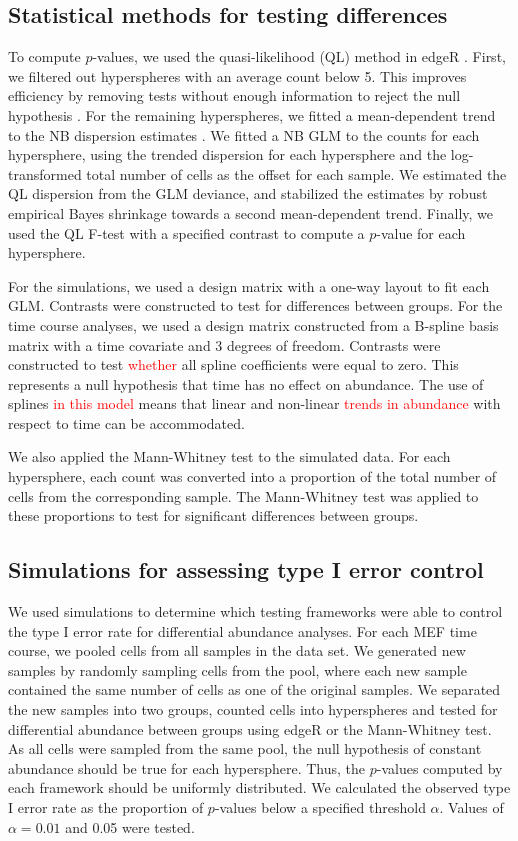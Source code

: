 \documentclass{article}
\newcommand\revised[1]{\textcolor{red}{#1}}
\begin{document}
\subsection{Statistical methods for testing differences}
To compute $p$-values, we used the quasi-likelihood (QL) method in edgeR \cite{lund2012detecting}.
First, we filtered out hyperspheres with an average count below 5.
This improves efficiency by removing tests without enough information to reject the null hypothesis \cite{bourgon2010independent}.
For the remaining hyperspheres, we fitted a mean-dependent trend to the NB dispersion estimates \cite{mccarthy2012differential}.
We fitted a NB GLM to the counts for each hypersphere, using the trended dispersion for each hypersphere and the log-transformed total number of cells as the offset for each sample.
We estimated the QL dispersion from the GLM deviance, and stabilized the estimates by robust empirical Bayes shrinkage \cite{phipson2016robust} towards a second mean-dependent trend.
Finally, we used the QL F-test with a specified contrast to compute a $p$-value for each hypersphere.

For the simulations, we used a design matrix with a one-way layout to fit each GLM.
Contrasts were constructed to test for differences between groups.
For the time course analyses, we used a design matrix constructed from a B-spline basis matrix with a time covariate and 3 degrees of freedom.
Contrasts were constructed to test \revised{whether} all spline coefficients were equal to zero.
This represents a null hypothesis that time has no effect on abundance.
The use of splines \revised{in this model} means that linear and non-linear \revised{trends in abundance} with respect to time can be accommodated.

We also applied the Mann-Whitney test to the simulated data.
For each hypersphere, each count was converted into a proportion of the total number of cells from the corresponding sample.
The Mann-Whitney test was applied to these proportions to test for significant differences between groups.

\subsection{Simulations for assessing type I error control}
We used simulations to determine which testing frameworks were able to control the type I error rate for differential abundance analyses.
For each MEF time course, we pooled cells from all samples in the data set.
We generated new samples by randomly sampling cells from the pool, where each new sample contained the same number of cells as one of the original samples.
We separated the new samples into two groups, counted cells into hyperspheres and tested for differential abundance between groups using edgeR or the Mann-Whitney test.
As all cells were sampled from the same pool, the null hypothesis of constant abundance should be true for each hypersphere.
Thus, the $p$-values computed by each framework should be uniformly distributed.
We calculated the observed type I error rate as the proportion of $p$-values below a specified threshold $\alpha$.
Values of $\alpha=0.01$ and 0.05 were tested.
\end{document}
